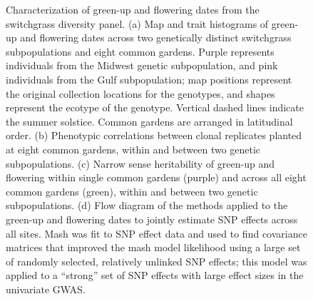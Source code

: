 \documentclass[
  9pt,
  twocolumn,
  twoside]{pnas-new}
\begin{document}
\begin{figure}


\caption{\label{fig-map}Characterization of green-up and flowering dates
from the switchgrass diversity panel. (a) Map and trait histograms of
green-up and flowering dates across two genetically distinct switchgrass
subpopulations and eight common gardens. Purple represents individuals
from the Midwest genetic subpopulation, and pink individuals from the
Gulf subpopulation; map positions represent the original collection
locations for the genotypes, and shapes represent the ecotype of the
genotype. Vertical dashed lines indicate the summer solstice. Common
gardens are arranged in latitudinal order. (b) Phenotypic correlations
between clonal replicates planted at eight common gardens, within and
between two genetic subpopulations. (c) Narrow sense heritability of
green-up and flowering within single common gardens (purple) and across
all eight common gardens (green), within and between two genetic
subpopulations. (d) Flow diagram of the methods applied to the green-up
and flowering dates to jointly estimate SNP effects across all sites.
Mash was fit to SNP effect data and used to find covariance matrices
that improved the mash model likelihood using a large set of randomly
selected, relatively unlinked SNP effects; this model was applied to a
``strong'' set of SNP effects with large effect sizes in the univariate
GWAS.}

\end{figure}%
\end{document}
